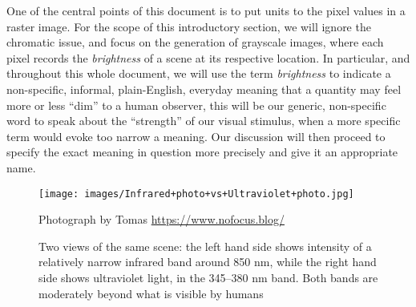 One of the central points of this document is to put units to the pixel values in a raster image. 
For the scope of this introductory section, we will ignore the chromatic issue, and focus on 
the generation of grayscale images, where each pixel records the \textsl{\gls{brightness}} of 
a scene at its respective location. 
In particular, and throughout this whole document, we will use the term \textsl{brightness} 
to indicate a non-specific, informal, plain-English, everyday meaning that a quantity may 
feel more or less ``dim'' to a human observer, this will be our generic, non-specific word to
speak about the ``strength'' of our visual stimulus, when a more specific term would evoke too
narrow a meaning. 
Our discussion will then proceed to specify the exact meaning in question more 
precisely and give it an appropriate name.

\begin{figure}
	{
		\hfill
		\texttt{[image: images/Infrared+photo+vs+Ultraviolet+photo.jpg]}
		\hfill
	}	

	\caption{\label{fig:uv_ir_photo}
		Two views of the same scene: the left hand side
		shows intensity of a relatively narrow infrared band around 850 \unit{\nano\meter},
		while the right hand side shows ultraviolet light, 
		in the 345--380 \unit{\nano\meter} band. 
		Both bands are moderately beyond what is visible by humans}
	{\scriptsize\hfill
		Photograph by Tomas \url{https://www.nofocus.blog/}
	}
\end{figure}

